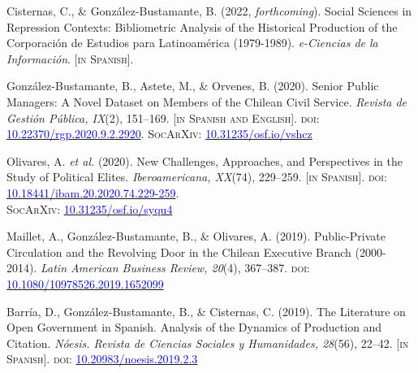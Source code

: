 \begin{publications}

\begin{benumerate}{9}

\item{\small Cisternas, C., \& González-Bustamante, B. (2022, {\itshape forthcoming}). Social Sciences in Repression Contexts: Bibliometric Analysis of the Historical Production of the Corporación de Estudios para Latinoamérica (1979-1989). {\itshape e-Ciencias de la Información}. {\footnotesize \scshape [in Spanish]}.}\vspace{1mm}

\item{\small González-Bustamante, B., Astete, M., \& Orvenes, B. (2020). Senior Public Managers: A Novel Dataset on Members of the Chilean Civil Service. {\itshape Revista de Gestión Pública, IX}(2), 151--169. {\footnotesize \scshape [in Spanish and English]}. {\scshape doi}: \href{https://doi.org/10.22370/rgp.2020.9.2.2920}{\textcolor{blue}{10.22370/rgp.2020.9.2.2920}}. {\scshape \footnotesize SocArXiv}: \href{https://doi.org/10.31235/osf.io/vshcz}{\textcolor{blue}{10.31235/osf.io/vshcz}}}\vspace{1mm}

\item{\small Olivares, A. {\itshape et al.} (2020). New Challenges, Approaches, and Perspectives in the Study of Political Elites. {\itshape Iberoamericana, XX}(74), 229--259. {\footnotesize \scshape [in Spanish]}. {\scshape doi}: \href{https://doi.org/10.18441/ibam.20.2020.74.229-259}{\textcolor{blue}{10.18441/ibam.20.2020.74.229-259}}. \\{\scshape \footnotesize SocArXiv}: \href{https://doi.org/10.31235/osf.io/syqu4}{\textcolor{blue}{10.31235/osf.io/syqu4}}}\vspace{1mm}

\item{\small Maillet, A., Gonz\'alez-Bustamante, B., \& Olivares, A. (2019). Public-Private Circulation and the Revolving Door in the Chilean Executive Branch (2000-2014). {\itshape Latin American Business Review, 20}(4), 367--387. {\scshape doi}: \href{https://doi.org/10.1080/10978526.2019.1652099}{\textcolor{blue}{10.1080/10978526.2019.1652099}}}\vspace{1mm}

\item{\small Barr\'ia, D., Gonz\'alez-Bustamante, B., \& Cisternas, C. (2019). The Literature on Open Government in Spanish. Analysis of the Dynamics of Production and Citation. {\itshape N\'oesis. Revista de Ciencias Sociales y Humanidades, 28}(56), 22--42. {\footnotesize \scshape [in Spanish]}. {\scshape doi}: \href{http://dx.doi.org/10.20983/noesis.2019.2.3}{\textcolor{blue}{10.20983/noesis.2019.2.3}}}\vspace{1mm}


\end{benumerate}
\end{publications}
